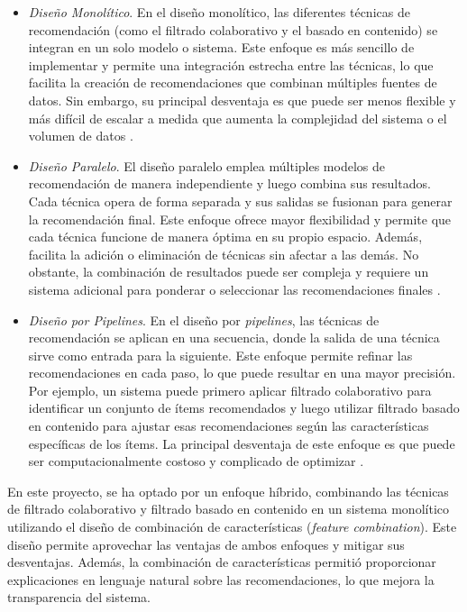 \documentclass{llncs}
\begin{document}
	\begin{itemize}
		\item \textit{Diseño Monolítico}.
		En el diseño monolítico, las diferentes técnicas de recomendación (como el filtrado colaborativo y el basado en contenido) se integran en un solo modelo o sistema. Este enfoque es más sencillo de implementar y permite una integración estrecha entre las técnicas, lo que facilita la creación de recomendaciones que combinan múltiples fuentes de datos. Sin embargo, su principal desventaja es que puede ser menos flexible y más difícil de escalar a medida que aumenta la complejidad del sistema o el volumen de datos \cite{burke2002hybrid}.
		
		\item \textit{Diseño Paralelo}.
		El diseño paralelo emplea múltiples modelos de recomendación de manera independiente y luego combina sus resultados. Cada técnica opera de forma separada y sus salidas se fusionan para generar la recomendación final. Este enfoque ofrece mayor flexibilidad y permite que cada técnica funcione de manera óptima en su propio espacio. Además, facilita la adición o eliminación de técnicas sin afectar a las demás. No obstante, la combinación de resultados puede ser compleja y requiere un sistema adicional para ponderar o seleccionar las recomendaciones finales \cite{adomavicius2015context}.
		
		\item \textit{Diseño por Pipelines}.
		En el diseño por \textit{pipelines}, las técnicas de recomendación se aplican en una secuencia, donde la salida de una técnica sirve como entrada para la siguiente. Este enfoque permite refinar las recomendaciones en cada paso, lo que puede resultar en una mayor precisión. Por ejemplo, un sistema puede primero aplicar filtrado colaborativo para identificar un conjunto de ítems recomendados y luego utilizar filtrado basado en contenido para ajustar esas recomendaciones según las características específicas de los ítems. La principal desventaja de este enfoque es que puede ser computacionalmente costoso y complicado de optimizar \cite{jannach2010recommender}.
	\end{itemize}
	
	En este proyecto, se ha optado por un enfoque híbrido, combinando las técnicas de filtrado colaborativo y filtrado basado en contenido en un sistema monolítico utilizando el diseño de combinación de características (\textit{feature combination}). Este diseño permite aprovechar las ventajas de ambos enfoques y mitigar sus desventajas. Además, la combinación de características permitió proporcionar explicaciones en lenguaje natural sobre las recomendaciones, lo que mejora la transparencia del sistema.
	
\end{document}
